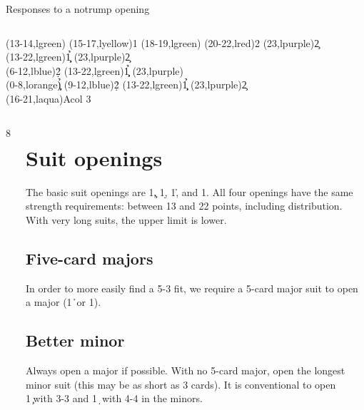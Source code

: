 \begin{sheet}{Responses to a notrump opening}
\begin{columns}{3}
\end{columns}


\iffalse
{\strut\hfill
\begin{ptable}
  \bid(13-14,lgreen){}
  \bid(15-17,lyellow){1\nt}
  \bid(18-19,lgreen){}
  \bid(20-22,lred){2\nt}
  \bid*(23,lpurple){2\c}\\
  \bid*(13-22,lgreen){1\c\d\h\s}
  \bid*(23,lpurple){2\c}\\
  \bid(6-12,lblue){2\d\h\s}
  \bid(13-22,lgreen){1\c\d\h\s}
  \bid(23,lpurple){}\\
  \bid(0-8,lorange){\c\d\h\s}
  \bid*(9-12,lblue){2\d\h\s}
  \bid*(13-22,lgreen){1\c\d\h\s}
  \bid*(23,lpurple){2\c}\\
  \bid(16-21,laqua){Acol 3\nt{}}\\
\end{ptable}\hfill\strut}


\begin{columns}8
\begin{column}[span=3]%
\section{Suit openings}
The basic suit openings are 1\c, 1\d, 1\h, and 1\s.  All four openings have
the same strength requirements: between 13 and 22 points, including
distribution.  With very long suits, the upper limit is lower.
\subsection{Five-card majors}
In order to more easily find a 5-3 fit, we require a 5-card major suit
to open a major (1\h\ or 1\s).
\subsection{Better minor}
Always open a major if possible.  With no 5-card major, open the longest
minor suit (this may be as short as 3 cards).  It is conventional to open
1\c\ with 3-3 and 1\d\ with 4-4 in the minors.
\end{column}


\end{columns}
\end{sheet}
